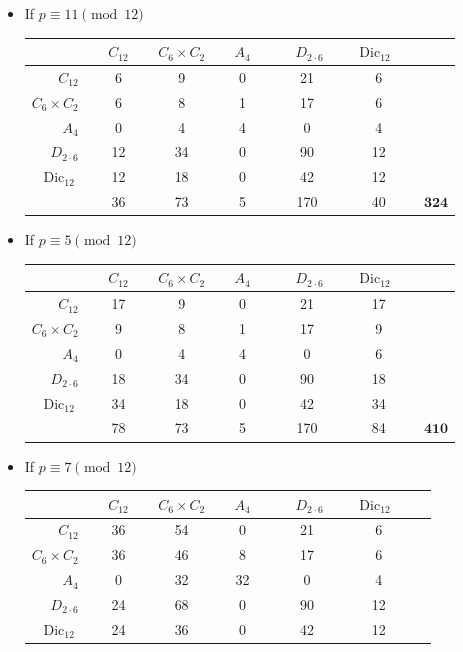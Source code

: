 \documentclass[12pt]{article}
\theoremstyle{definition}
\newcommand{\Dic}{\operatorname{Dic}}
\begin{document}
\begin{itemize}
	\item If $p\equiv 11 \pmod{12}$
	\begin{center}
		\begin{tabular}{r|c|c|c|c|c|c}
			&\, \, $C_{12}$ \, \,   &   $C_6\times C_2$   & \, \,  $A_4$ \, \,   & \, \, $D_{2\cdot 6}$\, \,  & \, $\Dic_{12}$ \, \, & \\
			\hline
			$C_{12}$        & 6 &9 & 0 & 21 & 6&\\
			$C_6\times C_2 $ & 6 & 8& 1& 17 &6&\\
			$A_4$           & 0 &4 & 4 & 0 &4 &\\
			$D_{2\cdot 6}$   & 12 &34 &0 & 90 &12&\\
			$\Dic_{12}$     & 12 &18 &0 & 42 &12&\\
			
			\hline
			&36&73  & 5 & 170 & 40 & $\mathbf{324}$\\
		\end{tabular}
	\end{center}
	
\item If $p\equiv 5 \pmod{12}$
	\begin{center}
		\begin{tabular}{r|c|c|c|c|c|c}
			&\, \, $C_{12}$ \, \,   &   $C_6\times C_2$   & \, \,  $A_4$ \, \,   & \, \, $D_{2\cdot 6}$\, \,  & \, $\Dic_{12}$ \, \, & \\
			\hline
			$C_{12}$        &17 &9 &0  & 21 &17 &\\
			$C_6\times C_2$  & 9 &8 &1 & 17 &9&\\
			$A_4$           &0 & 4& 4 & 0 &6 &\\
			$D_{2\cdot 6}$   & 18 &34 &0 & 90 & 18&\\
			$\Dic_{12}$     & 34 &18 &0 & 42 &34&\\
			
			\hline
			&78& 73 & 5 & 170 & 84 & $\mathbf{410}$\\
		\end{tabular}
	\end{center}
	
	\item If $p\equiv 7 \pmod{12}$
	\begin{center}
		\begin{tabular}{r|c|c|c|c|c|c}
			&\, \, $C_{12}$ \, \,   &   $C_6\times C_2$   & \, \,  $A_4$ \, \,   & \, \, $D_{2\cdot 6}$\, \,  & \, $\Dic_{12}$ \, \, & \\
			\hline
			$C_{12}$   &36 &54 & 0 & 21 & 6&\\
			$C_6\times C_2$  &36 & 46& 8& 17 &6&\\
			$A_4$   &0 & 32& 32 & 0 &4 &\\
			$D_{2\cdot 6}$  &24 &68 &0 & 90 &12&\\
			$\Dic_{12}$  & 24&36 & 0& 42 &12&\\
			

\end{tabular}
\end{center}
\end{itemize}
\end{document}
